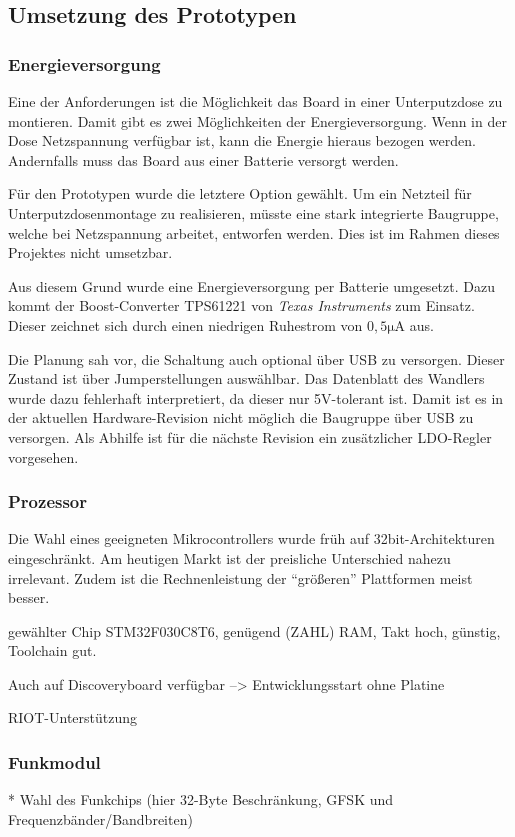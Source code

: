 \documentclass{IEEEtran}
\begin{document}
\subsection{Umsetzung des Prototypen}


\subsubsection{Energieversorgung}
Eine der Anforderungen ist die Möglichkeit das Board in einer Unterputzdose zu montieren.
Damit gibt es zwei Möglichkeiten der Energieversorgung.
Wenn in der Dose Netzspannung verfügbar ist, kann die Energie hieraus bezogen werden.
Andernfalls muss das Board aus einer Batterie versorgt werden.

Für den Prototypen wurde die letztere Option gewählt.
Um ein Netzteil für Unterputzdosenmontage zu realisieren, müsste eine stark integrierte Baugruppe, welche bei Netzspannung arbeitet, entworfen werden.
Dies ist im Rahmen dieses Projektes nicht umsetzbar.

Aus diesem Grund wurde eine Energieversorgung per Batterie umgesetzt.
Dazu kommt der Boost-Converter TPS61221 von \emph{Texas Instruments} zum Einsatz.
Dieser zeichnet sich durch einen niedrigen Ruhestrom von $0,5 \mathrm{\mu A}$ aus.

Die Planung sah vor, die Schaltung auch optional über USB zu versorgen.
Dieser Zustand ist über Jumperstellungen auswählbar.
Das Datenblatt des Wandlers wurde dazu fehlerhaft interpretiert, da dieser nur 5V-tolerant ist.
Damit ist es in der aktuellen Hardware-Revision nicht möglich die Baugruppe über USB zu versorgen.
Als Abhilfe ist für die nächste Revision ein zusätzlicher LDO-Regler vorgesehen.

\subsubsection{Prozessor}
Die Wahl eines geeigneten Mikrocontrollers wurde früh auf 32bit-Architekturen eingeschränkt.
Am heutigen Markt ist der preisliche Unterschied nahezu irrelevant.
Zudem ist die Rechnenleistung der \enquote{größeren} Plattformen meist besser.

gewählter Chip STM32F030C8T6, genügend (ZAHL) RAM, Takt hoch, günstig, Toolchain gut.

Auch auf Discoveryboard verfügbar --> Entwicklungsstart ohne Platine

RIOT-Unterstützung

\subsubsection{Funkmodul}
* Wahl des Funkchips (hier 32-Byte Beschränkung, GFSK und Frequenzbänder/Bandbreiten)
\end{document}
